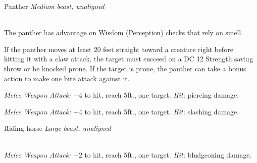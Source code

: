 \documentclass[10pt,twoside,twocolumn,openany]{book}
\begin{document}
\begin{monsterboxnobg}{Panther}
	\textit{Medium beast, unaligned}\\
	\hline
	\basics[
		armorclass	= 12,
		hitpoints		= \dice{3d8},
		speed		= {50 ft., climb 40 ft.}
	]
	\hline
	\stats[
		STR	= \stat{14},
		DEX	= \stat{15},
		CON	= \stat{10},
		INT	= \stat{3},
		WIS	= \stat{14},
		CHA	= \stat{7}
	]
	\hline
	\details[
		skills			= {Perception +4, Stealth +6},
		senses		= {passive Perception 14},
		languages		= {-},
		challenge		= 1/4
	]
	\hline \\[1mm]
	\begin{monsteraction}
		The panther has advantage on Wisdom (Perception) checks that rely on smell.
	\end{monsteraction}
	
	\begin{monsteraction}[Pounce]
		If the panther moves at least 20 feet straight toward a creature right before hitting it with a claw attack, the target must succeed on a DC 12 Strength saving throw or be knocked prone. If the target is prone, the panther can take a bonus action to make one bite attack against it.
	\end{monsteraction}
	\begin{monsteraction}[Bite]
		\textit{Melee Weapon Attack:} +4 to hit, reach 5ft., one target. \textit{Hit:}  piercing damage.
	\end{monsteraction}
	
	\begin{monsteraction}[Claw]
		\textit{Melee Weapon Attack:} +4 to hit, reach 5ft., one target. \textit{Hit:}  slashing damage.
	\end{monsteraction}
\end{monsterboxnobg}

\begin{monsterboxnobg}{Riding horse}
	\textit{Large beast, unaligned}\\
	\hline
	\basics[
		armorclass	= 10,
		hitpoints 		= \dice{2d10 + 2},
		speed		= {60 ft.}
	]
	\hline
	\stats[
		STR	= \stat{16},
		DEX	= \stat{10},
		CON	= \stat{12},
		INT	= \stat{2},
		WIS	= \stat{11},
		CHA	= \stat{7}
	]
	\hline
	\details[
		skills			= {},
		senses		= {passive Perception 10},
		languages		= {-},
		challenge		= 1/4
	]
	\hline \\[1mm]
	\begin{monsteraction}[Hooves]
		\textit{Melee Weapon Attack:} +2 to hit, reach 5ft., one target. \textit{Hit:}  bludgeoning damage.
	\end{monsteraction}
\end{monsterboxnobg}
\end{document}
